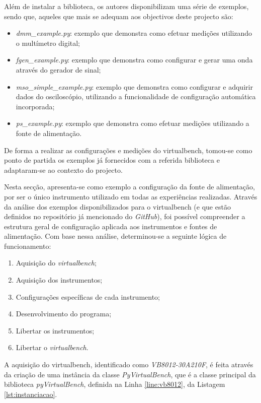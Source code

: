 Além de instalar a biblioteca, os autores disponibilizam uma série de exemplos, sendo que, aqueles que mais se adequam aos objectivos deste projecto são:
\begin{itemize}
	\item \textit{dmm\_example.py}: exemplo que demonstra como efetuar medições utilizando o multímetro digital;
	\item \textit{fgen\_example.py}: exemplo que demonstra como configurar e gerar uma onda através do gerador de sinal;
	\item \textit{mso\_simple\_example.py}: exemplo que demonstra como configurar e adquirir dados do osciloscópio, utilizando a funcionalidade de configuração automática incorporada;
	\item \textit{ps\_example.py}: exemplo que demonstra como efetuar medições utilizando a fonte de alimentação.
\end{itemize}

De forma a realizar as configurações e medições do \acrshort{virtualbench}, tomou-se como ponto de partida os exemplos já fornecidos com a referida biblioteca e adaptaram-se ao contexto do projecto. 

Nesta secção, apresenta-se como exemplo a configuração da fonte de alimentação, por ser o único instrumento utilizado em todas as experiências realizadas.  Através da análise dos exemplos disponibilizados para o \acrshort{virtualbench} (e que estão definidos no repositório já mencionado do \textit{GitHub}), foi possível compreender a estrutura geral de configuração aplicada aos instrumentos e fontes de alimentação. Com base nessa análise, determinou-se a seguinte lógica de funcionamento:

\begin{enumerate}
	\label{item:logica}
	\item Aquisição do \textit{virtualbench};
	\item Aquisição dos instrumentos;
	\item Configurações específicas de cada instrumento;
	\item Desenvolvimento do programa;
	\item Libertar os instrumentos;
	\item Libertar o \textit{virtualbench}.
\end{enumerate}

A aquisição do \acrshort{virtualbench}, identificado como \textit{VB8012-30A210F}, é feita através da criação de uma instância da classe \textit{PyVirtualBench}, que é a classe principal da biblioteca \textit{pyVirtualBench}, definida na Linha \ref{line:vb8012}, da Listagem \ref{lst:instanciacao}.

